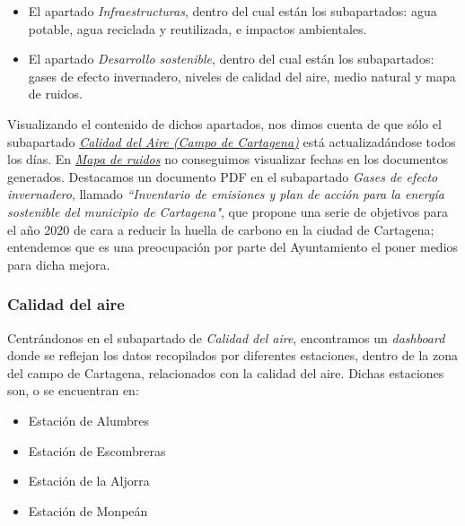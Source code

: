 \documentclass[12pt]{article}
\begin{document}
		\begin{itemize}
		\item El apartado \textit{Infraestructuras}, dentro del cual están los subapartados: agua potable, agua reciclada y reutilizada, e impactos ambientales.
		\item El apartado \textit{Desarrollo sostenible}, dentro del cual están los subapartados: gases de efecto invernadero, niveles de calidad del aire, medio natural y mapa de ruidos.
	\end{itemize} 
	
	\noindent Visualizando el contenido de dichos apartados, nos dimos cuenta de que sólo el subapartado 	\href{https://www.cartagena.es/calidad_aire.asp}{\textit{Calidad del Aire (Campo de Cartagena)}} está actualizadándose todos los días. En \href{https://urbanismo.cartagena.es/PortalUrbanismo/Paginas/65 en urbanismo no tienen informes ambientales}{\textit{Mapa de ruidos}} no conseguimos visualizar fechas en los documentos generados. Destacamos un documento PDF en el subapartado \textit{Gases de efecto invernadero}, llamado  \textit{``Inventario de emisiones y plan de acción para la energía sostenible del municipio de Cartagena"}, que propone una serie de objetivos para el año 2020 de cara a reducir la huella de carbono en la ciudad de Cartagena; entendemos que es una preocupación por parte del Ayuntamiento el poner medios para dicha mejora. \\
	
	
	\subsubsection{Calidad del aire}
	
	\noindent Centrándonos en el subapartado de \textit{Calidad del aire}, encontramos un \textit{dashboard} donde se reflejan los datos recopilados por diferentes estaciones, dentro de la zona del campo de Cartagena, relacionados con la calidad del aire. Dichas estaciones son, o se encuentran en: 
	
	\begin{itemize}
		\item Estación de Alumbres
		\item Estación de Escombreras
		\item Estación de la Aljorra
		\item Estación de Monpeán
	\end {itemize}
	
\end{document}
